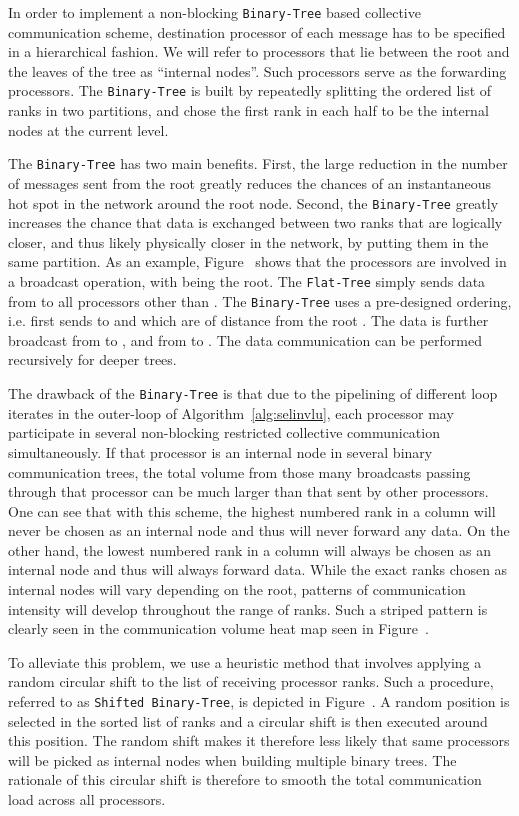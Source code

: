 \documentclass{acm_proc_article-sp}
\newcommand{\flattree}{\texttt{Flat-Tree}\xspace}
\newcommand{\btree}{\texttt{Binary-Tree}\xspace}
\newcommand{\modbtree}{\texttt{Shifted Binary-Tree}\xspace}
\begin{document}
In order to implement a non-blocking \btree based collective communication 
scheme, destination processor of each message has to be specified
in a hierarchical fashion.  We will refer to processors that 
lie between the root and the leaves of the tree as ``internal nodes''. 
Such processors serve as the forwarding processors.
The \btree is built by repeatedly splitting the ordered list of ranks
in two partitions, and chose the first rank in each half to be the
internal nodes at the current level.

The \btree has two main benefits.  First, the large reduction in 
the number of messages sent from the root greatly reduces the chances of an 
instantaneous hot spot in the network around the root node.  Second, 
the \btree greatly increases the chance that data is exchanged between
two ranks that are logically closer, and thus likely physically closer in the network,
by putting them in the same partition.
As an example, Figure~ shows that the processors
 are involved in a broadcast operation, with  being
the root.  The \flattree simply sends data from  to all
processors other than . The \btree uses a pre-designed ordering,
i.e.  first sends to  and  which are of
distance  from the root .  The data is further broadcast from
 to , and from  to .  The data
communication can be performed recursively for deeper trees. 


The drawback of the \btree is that due to the pipelining of different loop iterates in the 
outer-loop of Algorithm~\ref{alg:selinvlu}, each processor may participate 
in several non-blocking restricted collective communication simultaneously. If
that processor is an internal node in several binary communication trees,
the total volume from those many broadcasts passing through that processor can be 
much larger than that sent by other processors.
One can see that with this scheme, the highest numbered rank in a 
column will never be chosen as an internal node and thus will 
never forward any data.
On the other hand, the lowest numbered
rank in a column will always be chosen as an internal node and thus
will always forward data.  While the exact ranks chosen as internal
nodes will vary depending on the root, patterns of communication 
intensity will develop throughout the range of ranks.  Such a 
striped pattern is clearly seen in the communication volume heat map seen in 
Figure~. 



To alleviate this problem, we use a heuristic method that involves
applying a random circular shift to the list of receiving processor ranks.
Such a procedure, referred to as \modbtree, is depicted in 
Figure~. A random position is selected in
the sorted list of ranks and a circular shift is then executed around this position.
The random shift makes it therefore less likely that same processors
will be picked as internal nodes when building multiple binary trees. The
rationale of this circular shift is therefore to smooth the total communication
load across all processors. 
\end{document}
